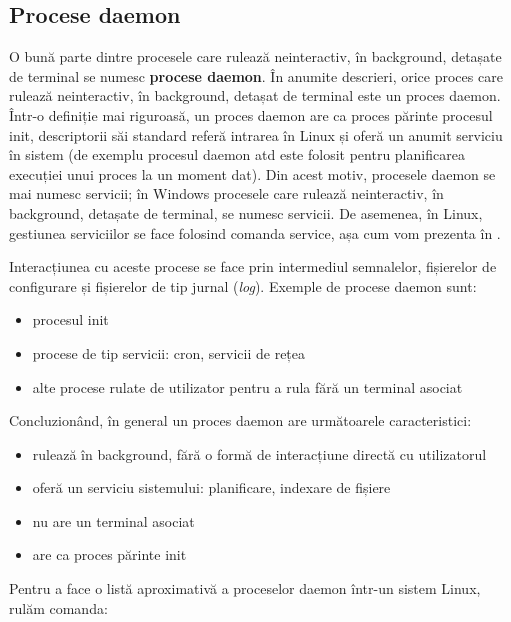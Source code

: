 \subsection{Procese daemon}
\label{sec:process-interactivitate-daemon}

O bună parte dintre procesele care rulează neinteractiv, în background, detașate
de terminal se numesc \textbf{procese daemon}. În anumite descrieri, orice proces care
rulează neinteractiv, în background, detașat de terminal este un proces daemon.
Într-o definiție mai riguroasă, un proces daemon are ca proces părinte procesul
init, descriptorii săi standard referă intrarea  în Linux și oferă un
anumit serviciu în sistem (de exemplu procesul daemon atd este folosit pentru
planificarea execuției unui proces la un moment dat). Din acest motiv, procesele
daemon se mai numesc servicii; în Windows procesele care rulează neinteractiv,
în background, detașate de terminal, se numesc servicii. De asemenea, în Linux,
gestiunea serviciilor se face folosind comanda service, așa cum vom prezenta în
.

Interacțiunea cu aceste procese se face prin intermediul semnalelor, fișierelor
de configurare și fișierelor de tip jurnal (\textit{log}). Exemple de procese daemon
sunt:

\begin{itemize}
	\item procesul init
	\item procese de tip servicii: cron, servicii de rețea
	\item alte procese rulate de utilizator pentru a rula fără un terminal
		asociat
\end{itemize}

Concluzionând, în general un proces daemon are următoarele caracteristici:

\begin{itemize}
	\item rulează în background, fără o formă de interacțiune directă cu
		utilizatorul
	\item oferă un serviciu sistemului: planificare, indexare de fișiere
	\item nu are un terminal asociat
	\item are ca proces părinte init
\end{itemize}

Pentru a face o listă aproximativă a proceselor daemon într-un sistem Linux, rulăm comanda:


